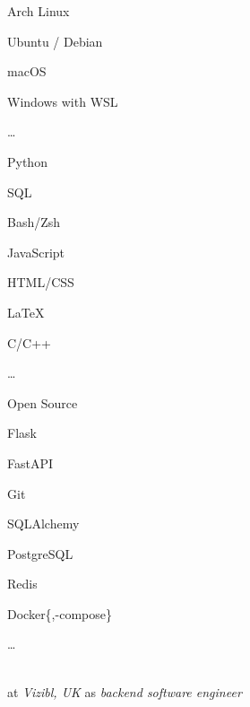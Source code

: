 \SmallSep

\begin{multicols}{3}
\begin{compactitem}[\color{Cyan}$\circ$]
	\item Arch Linux
	\item Ubuntu / Debian
	\item macOS
	\item Windows with WSL
	\item \ldots
\end{compactitem}
\end{multicols}

\SmallSep

\begin{multicols}{3}
\begin{compactitem}[\color{Cyan}$\circ$]
    \item Python
    \item SQL
    \item Bash/Zsh
    \item JavaScript
    \item HTML/CSS
    \item \LaTeX
    \item C/C++
	\item \ldots
\end{compactitem}
\end{multicols}

\SmallSep

\begin{multicols}{3}
\begin{compactitem}[\color{Cyan}$\circ$]
    \item Open Source \heart\
    \item Flask
    \item FastAPI
    \item Git
    \item SQLAlchemy
    \item PostgreSQL
    \item Redis
    \item Docker\{,-compose\}
    \item \ldots
\end{compactitem}
\end{multicols}

\Sep



 \\
at \textit{Vizibl, UK}
as \textit{backend software engineer}
\SmallSep

